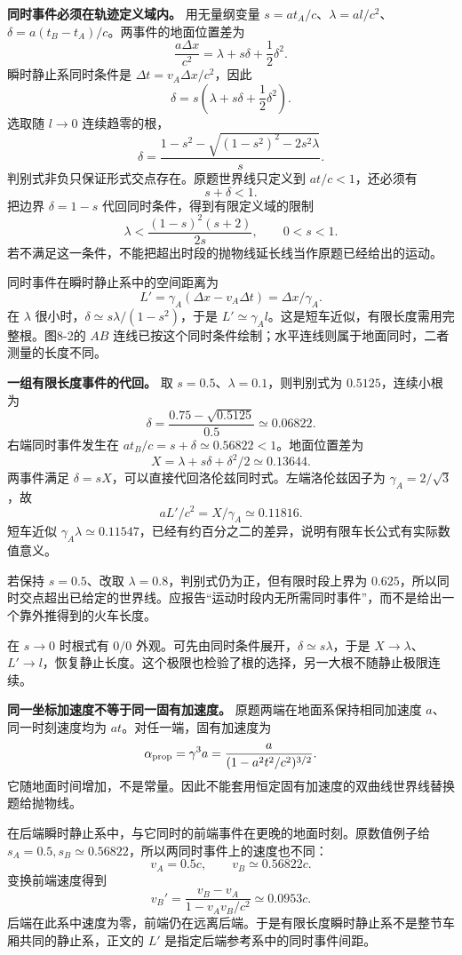 \documentclass[12pt,a4paper,UTF8]{ctexart}
\begin{document}
\textbf{同时事件必须在轨迹定义域内。} 用无量纲变量
\(s=at_A/c\)、\(\lambda=al/c^2\)、\(\delta=a(t_B-t_A)/c\)。两事件的地面位置差为
\[
\frac{a\Delta x}{c^2}=\lambda+s\delta+\frac12\delta^2.
\] 瞬时静止系同时条件是 \(\Delta t=v_A\Delta x/c^2\)，因此 \[
\delta=s\left(\lambda+s\delta+\frac12\delta^2\right).
\] 选取随 \(l\to0\) 连续趋零的根， \[
\delta=\frac{1-s^2-\sqrt{(1-s^2)^2-2s^2\lambda}}s.
\] 判别式非负只保证形式交点存在。原题世界线只定义到 \(at/c<1\)，还必须有
\[
s+\delta<1.
\] 把边界 \(\delta=1-s\) 代回同时条件，得到有限定义域的限制 \[
\lambda<\frac{(1-s)^2(s+2)}{2s},\qquad0<s<1.
\]
若不满足这一条件，不能把超出时段的抛物线延长线当作原题已经给出的运动。

同时事件在瞬时静止系中的空间距离为 \[
L'=\gamma_A(\Delta x-v_A\Delta t)=\Delta x/\gamma_A.
\] 在 \(\lambda\) 很小时，\(\delta\simeq s\lambda/(1-s^2)\)，于是
\(L'\simeq\gamma_A l\)。这是短车近似，有限长度需用完整根。图8-2的 \(AB\)
连线已按这个同时条件绘制；水平连线则属于地面同时，二者测量的长度不同。

\textbf{一组有限长度事件的代回。} 取
\(s=0.5\)、\(\lambda=0.1\)，则判别式为 \(0.5125\)，连续小根为 \[
\delta=\frac{0.75-\sqrt{0.5125}}{0.5}\simeq0.06822.
\] 右端同时事件发生在 \(at_B/c=s+\delta\simeq0.56822<1\)。地面位置差为
\[
X=\lambda+s\delta+\delta^2/2\simeq0.13644.
\] 两事件满足 \(\delta=sX\)，可以直接代回洛伦兹同时式。左端洛伦兹因子为
\(\gamma_A=2/\sqrt3\)，故 \[
aL'/c^2=X/\gamma_A\simeq0.11816.
\] 短车近似
\(\gamma_A\lambda\simeq0.11547\)，已经有约百分之二的差异，说明有限车长公式有实际数值意义。

若保持 \(s=0.5\)、改取 \(\lambda=0.8\)，判别式仍为正，但有限时段上界为
\(0.625\)，所以同时交点超出已给定的世界线。应报告``运动时段内无所需同时事件''，而不是给出一个靠外推得到的火车长度。

在 \(s\to0\) 时根式有 \(0/0\)
外观。可先由同时条件展开，\(\delta\simeq s\lambda\)，于是
\(X\to\lambda\)、\(L'\to l\)，恢复静止长度。这个极限也检验了根的选择，另一大根不随静止极限连续。

\textbf{同一坐标加速度不等于同一固有加速度。}
原题两端在地面系保持相同加速度 \(a\)、同一时刻速度均为
\(at\)。对任一端，固有加速度为 \[
\alpha_{\rm prop}=\gamma^3a
=\frac{a}{(1-a^2t^2/c^2)^{3/2}}.
\]
它随地面时间增加，不是常量。因此不能套用恒定固有加速度的双曲线世界线替换题给抛物线。

在后端瞬时静止系中，与它同时的前端事件在更晚的地面时刻。原数值例子给
\(s_A=0.5,s_B\simeq0.56822\)，所以两同时事件上的速度也不同： \[
v_A=0.5c,
\qquad v_B\simeq0.56822c.
\] 变换前端速度得到 \[
v_B'=\frac{v_B-v_A}{1-v_Av_B/c^2}\simeq0.0953c.
\]
后端在此系中速度为零，前端仍在远离后端。于是有限长度瞬时静止系不是整节车厢共同的静止系，正文的
\(L'\) 是指定后端参考系中的同时事件间距。
\end{document}
